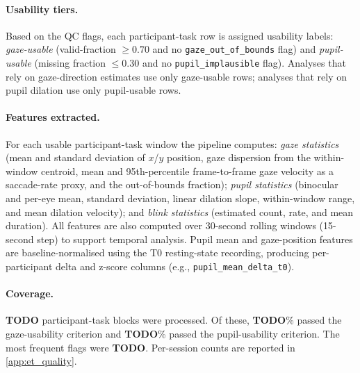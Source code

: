 \paragraph{Usability tiers.}
Based on the QC flags, each participant-task row is assigned usability labels:
\emph{gaze-usable} (valid-fraction $\geq 0.70$ and no
\texttt{gaze\_out\_of\_bounds} flag) and
\emph{pupil-usable} (missing fraction $\leq 0.30$ and no
\texttt{pupil\_implausible} flag).
Analyses that rely on gaze-direction estimates use only gaze-usable rows;
analyses that rely on pupil dilation use only pupil-usable rows.

\paragraph{Features extracted.}
For each usable participant-task window the pipeline computes:
\emph{gaze statistics} (mean and standard deviation of $x$/$y$ position,
gaze dispersion from the within-window centroid,
mean and 95th-percentile frame-to-frame gaze velocity as a saccade-rate proxy,
and the out-of-bounds fraction);
\emph{pupil statistics} (binocular and per-eye mean, standard deviation,
linear dilation slope, within-window range, and mean dilation velocity);
and \emph{blink statistics} (estimated count, rate, and mean duration).
All features are also computed over 30-second rolling windows (15-second step)
to support temporal analysis.
Pupil mean and gaze-position features are baseline-normalised using the T0
resting-state recording, producing per-participant delta and z-score columns
(e.g., \texttt{pupil\_mean\_delta\_t0}).

\paragraph{Coverage.}
\textbf{TODO} participant-task blocks were processed.
Of these, \textbf{TODO}\% passed the gaze-usability criterion and
\textbf{TODO}\% passed the pupil-usability criterion.
The most frequent flags were \textbf{TODO}.
Per-session counts are reported in \cref{app:et_quality}.
